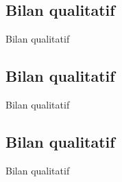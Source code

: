 \documentclass[aspectratio=169]{beamer}
\begin{document}
\subsection{Bilan qualitatif}
\begin{frame}{Bilan qualitatif}
 
\end{frame}

\subsection{Bilan qualitatif}
\begin{frame}{Bilan qualitatif}
 
\end{frame}

\subsection{Bilan qualitatif}
\begin{frame}{Bilan qualitatif}
 
\end{frame}
\end{document}
